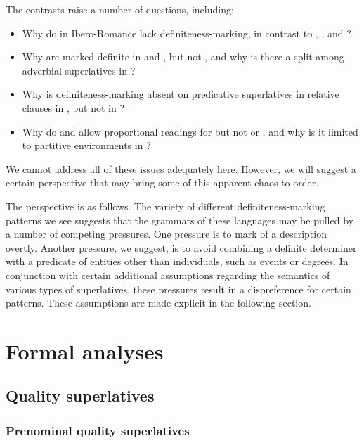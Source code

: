 \documentclass[output=paper
,modfonts
,nonflat]{langsci/langscibook}
\begin{document}
The contrasts raise a number of questions, including:
\begin{itemize}
\item Why do  in Ibero-Romance lack definiteness-marking, in contrast to , , and ?
\item Why are  marked definite in  and , but not , and why is there a split among adverbial superlatives in ?
\item Why is definiteness-marking absent on predicative superlatives in relative clauses in , but not in ?
\item Why do  and  allow proportional readings for  but not  or , and why is it limited to partitive environments in ?
\end{itemize}

We cannot address all of these issues adequately here. However, we will suggest a certain perspective that may bring some of this apparent chaos to order.

The perspective is as follows.  The variety of different definiteness-marking patterns we see suggests that the grammars of these languages may be pulled by a number of competing pressures. One pressure is to mark  of a description overtly. Another pressure, we suggest, is to avoid combining a definite determiner with a predicate of entities other than individuals, such as events or degrees. In conjunction with certain additional assumptions regarding the semantics of various types of superlatives, these pressures result in a dispreference for certain patterns. These assumptions are made explicit in the following section.

\section{Formal analyses} \label{sec:coppockstrand:6}

\subsection{Quality superlatives}

\subsubsection{Prenominal quality superlatives}
\end{document}
